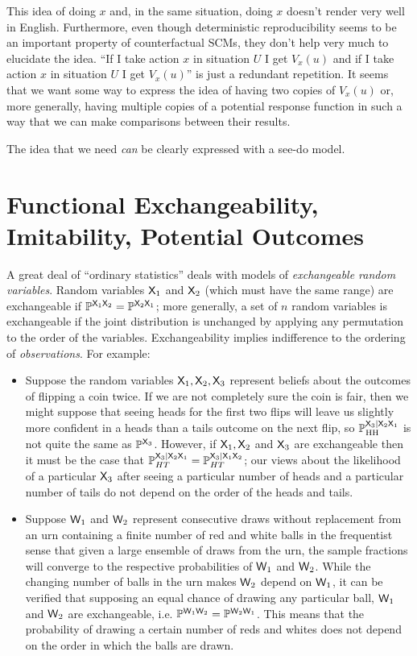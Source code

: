 This idea of doing $x$ and, in the same situation, doing $x$ doesn't render very well in English. Furthermore, even though deterministic reproducibility seems to be an important property of counterfactual SCMs, they don't help very much to elucidate the idea. ``If I take action $x$ in situation $U$ I get $V_x(u)$ and if I take action $x$ in situation $U$ I get $V_x(u)$'' is just a redundant repetition. It seems that we want some way to express the idea of having two copies of $V_x(u)$ or, more generally, having multiple copies of a potential response function in such a way that we can make comparisons between their results.

The idea that we need \emph{can} be clearly expressed with a see-do model. 


\section{Functional Exchangeability, Imitability, Potential Outcomes}

A great deal of ``ordinary statistics'' deals with models of \emph{exchangeable random variables}. Random variables $\mathsf{X}_1$ and $\mathsf{X}_2$ (which must have the same range) are exchangeable if $\mathbb{P}^{\mathsf{X}_1\mathsf{X}_2} = \mathbb{P}^{\mathsf{X}_2\mathsf{X}_1}$; more generally, a set of $n$ random variables is exchangeable if the joint distribution is unchanged by applying any permutation to the order of the variables. Exchangeability implies indifference to the ordering of \emph{observations}. For example:
\begin{itemize}
    \item Suppose the random variables $\mathsf{X}_1, \mathsf{X}_2, \mathsf{X}_3$ represent beliefs about the outcomes of flipping a coin twice. If we are not completely sure the coin is fair, then we might suppose that seeing heads for the first two flips will leave us slightly more confident in a heads than a tails outcome on the next flip, so $\mathbb{P}^{\mathsf{X}_3|\mathsf{X}_2\mathsf{X}_1}_{\text{HH}}$ is not quite the same as $\mathbb{P}^{\mathsf{X}_3}$. However, if $\mathsf{X}_1,\mathsf{X}_2$ and $\mathsf{X}_3$ are exchangeable then it must be the case that $\mathbb{P}^{\mathsf{X}_3|\mathsf{X}_2\mathsf{X}_1}_{HT}=\mathbb{P}^{\mathsf{X}_3|\mathsf{X}_1\mathsf{X}_2}_{HT}$; our views about the likelihood of a particular $\mathsf{X}_3$ after seeing a particular number of heads and a particular number of tails do not depend on the order of the heads and tails.
    \item Suppose $\mathsf{W}_1$ and $\mathsf{W}_2$ represent consecutive draws without replacement from an urn containing a finite number of red and white balls in the frequentist sense that given a large ensemble of draws from the urn, the sample fractions will converge to the respective probabilities of $\mathsf{W}_1$ and $\mathsf{W}_2$. While the changing number of balls in the urn makes $\mathsf{W}_2$ depend on $\mathsf{W}_1$, it can be verified that supposing an equal chance of drawing any particular ball, $\mathsf{W}_1$ and $\mathsf{W}_2$ are exchangeable, i.e. $\mathbb{P}^{\mathsf{W}_1\mathsf{W}_2}=\mathbb{P}^{\mathsf{W}_2\mathsf{W}_1}$. This means that the probability of drawing a certain number of reds and whites does not depend on the order in which the balls are drawn.
\end{itemize}

